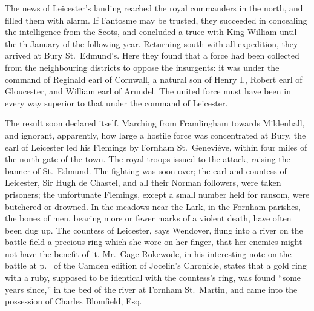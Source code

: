 \documentclass[10pt]{book}
\begin{document}
{The news of Leicester's landing reached the royal commanders in the north, and filled them with alarm. If Fantosme may be trusted, they succeeded in concealing the intelligence from the Scots, and concluded a truce with King William until the th January of the following year. Returning south with all expedition, they arrived at Bury St.\ Edmund's. Here they found that a force had been collected from the neighbouring districts to oppose the insurgents: it was under the command of Reginald earl of Cornwall, a natural son of Henry I., Robert earl of Gloucester, and William earl of Arundel. The united force must have been in every way superior to that under the command of Leicester.

The result soon declared itself. Marching from Framlingham towards Mildenhall, and ignorant, apparently, how large a hostile force was concentrated at Bury, the earl of Leicester led his Flemings by Fornham St.\ Geneviéve, within four miles of the north gate of the town. The royal troops issued to the attack, raising the banner of St.\ Edmund. The fighting was soon over; the earl and countess of Leicester, Sir Hugh de Chastel, and all their Norman followers, were taken prisoners; the unfortunate Flemings, except a small number held for ransom, were butchered or drowned. In the meadows near the Lark, in the Fornham parishes, the bones of men, bearing more or fewer marks of a violent death, have often been dug up. The countess of Leicester, says Wendover, flung into a river on the battle-field a precious ring which she wore on her finger, that her enemies might not have the benefit of it. Mr.\ Gage Rokewode, in his interesting note on the battle at p.\  of the Camden edition of Jocelin's Chronicle, states that a gold ring with a ruby, supposed to be identical with the countess's ring, was found ``some years since,'' in the bed of the river at Fornham St.\ Martin, and came into the possession of Charles Blomfield, Esq.

}
\end{document}
